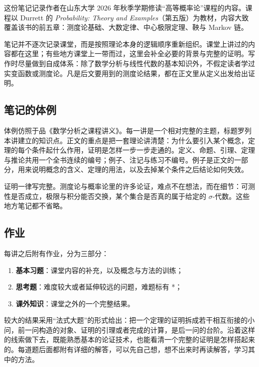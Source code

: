 
这份笔记记录作者在山东大学 2026 年秋季学期修读“高等概率论”课程的内容。课程以 Durrett 的 \emph{Probability: Theory and Examples}（第五版）为教材，内容大致覆盖该书的前五章：测度论基础、大数定律、中心极限定理、鞅与 Markov 链。

笔记并不逐次记录课堂，而是按照理论本身的逻辑顺序重新组织。课堂上讲过的内容都在这里；有些地方课堂上一带而过，这里会补全必要的背景与完整的证明。写作时尽量做到自成体系：除了数学分析与线性代数的基本知识外，不假定读者学过实变函数或测度论。凡是后文要用到的测度论结果，都在正文里从定义出发给出证明。

\subsection*{笔记的体例}

体例仿照于品《数学分析之课程讲义》。每一讲是一个相对完整的主题，标题罗列本讲建立的知识点。正文的重点是把一套理论讲清楚：为什么要引入某个概念，定理的每个条件起什么作用，证明是怎样一步一步走通的。定义、命题、引理、定理与推论共用一个全书连续的编号；例子、注记与练习不编号。例子是正文的一部分，用来说明概念的含义、定理的用法，以及去掉某个条件之后结论如何失效。

证明一律写完整。测度论与概率论里的许多论证，难点不在想法，而在细节：可测性是否成立，极限与积分能否交换，某个集合是否真的属于给定的 $\sigma$-代数。这些地方笔记都不省略。

\subsection*{作业}

每讲之后附有作业，分为三部分：
\begin{enumerate}
  \item \textbf{基本习题}：课堂内容的补充，以及概念与方法的训练；
  \item \textbf{思考题}：难度较大或者延伸较远的问题，难题标有 *；
  \item \textbf{课外知识}：课堂之外的一个完整结果。
\end{enumerate}
较大的结果采用“法式大题”的形式给出：把一个定理的证明拆成若干相互衔接的小问，前一问构造的对象、证明的引理或者完成的计算，是后一问的台阶。沿着这样的线索做下去，既能熟悉基本的论证技术，也能看清一个完整的证明是怎样搭起来的。每道题后面都附有详细的解答，可以先自己想，想不出来时再读解答，学习其中的方法。
